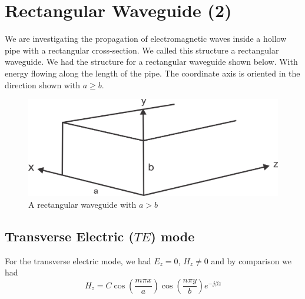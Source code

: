\chapter{Rectangular Waveguide (2)}

We are investigating the propagation of electromagnetic waves inside a hollow pipe with a rectangular cross-section. We called this structure a rectangular waveguide. We had the structure for a rectangular waveguide shown below. With energy flowing along the length of the pipe. The coordinate axis is oriented in the direction shown with $a\geq b$.
\begin{figure}[h]
\centering
\includegraphics[width=1\linewidth]{./graphics/group39}
\caption{A rectangular waveguide with $a>b$}
\end{figure}

\section{Transverse Electric  ($TE$) mode}
For the transverse electric mode, we had $E_z = 0$, $H_z \neq 0$ and by comparison we had 
\begin{dmath}
H_z = C\cos(\frac{m\pi x}{a}) \cos(\frac{n\pi y}{b})e^{-j\beta z}
\label{eqn:magneticfield}
\end{dmath}

